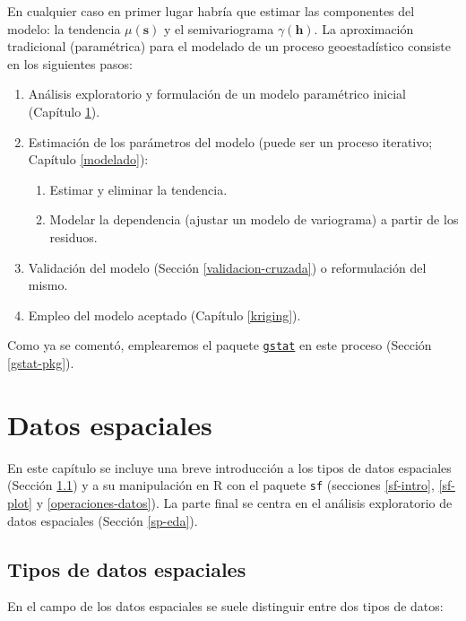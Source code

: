 \documentclass[
  spanish,
]{book}
\theoremstyle{break}
\theoremstyle{definition}
\theoremstyle{definition}
\theoremstyle{definition}
\theoremstyle{definition}
\theoremstyle{remark}
\begin{document}
En cualquier caso en primer lugar habría que estimar las componentes del modelo: la tendencia \(\mu(\mathbf{s})\) y el semivariograma \(\gamma(\mathbf{h})\).
La aproximación tradicional (paramétrica) para el modelado de un proceso geoestadístico consiste en los siguientes pasos:

\begin{enumerate}
\def\labelenumi{\arabic{enumi}.}
\item
  Análisis exploratorio y formulación de un modelo paramétrico inicial (Capítulo \ref{datos}).
\item
  Estimación de los parámetros del modelo (puede ser un proceso iterativo; Capítulo \ref{modelado}):

  \begin{enumerate}
  \def\labelenumii{\arabic{enumii}.}
  \item
    Estimar y eliminar la tendencia.
  \item
    Modelar la dependencia (ajustar un modelo de variograma) a partir de los residuos.
  \end{enumerate}
\item
  Validación del modelo (Sección \ref{validacion-cruzada}) o reformulación del mismo.
\item
  Empleo del modelo aceptado (Capítulo \ref{kriging}).
\end{enumerate}

Como ya se comentó, emplearemos el paquete \href{https://r-spatial.github.io/gstat}{\texttt{gstat}} en este proceso (Sección \ref{gstat-pkg}).

\hypertarget{datos}{%
\chapter{Datos espaciales}\label{datos}}

En este capítulo se incluye una breve introducción a los tipos de datos espaciales (Sección \ref{datos-tipos}) y a su manipulación en R con el paquete \texttt{sf} (secciones \ref{sf-intro}, \ref{sf-plot} y \ref{operaciones-datos}).
La parte final se centra en el análisis exploratorio de datos espaciales (Sección \ref{sp-eda}).

\hypertarget{datos-tipos}{%
\section{Tipos de datos espaciales}\label{datos-tipos}}

En el campo de los datos espaciales se suele distinguir entre dos tipos de datos:
\end{document}
